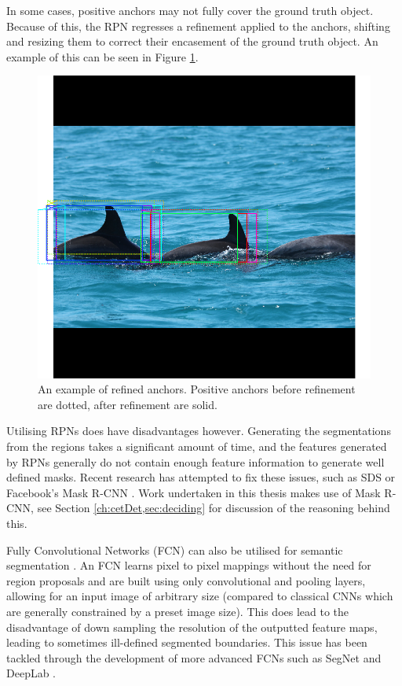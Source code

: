 In some cases, positive anchors may not fully cover the ground truth object. Because of this, the RPN regresses a refinement applied to the anchors, shifting and resizing them to correct their encasement of the ground truth object. An example of this can be seen in Figure \ref{fig:rpn-refined}.

\begin{figure}
	\begin{center}
		\includegraphics[scale=0.3]{Chapter2/figs/rpn-refined.png}
	\end{center}
	\caption[An example of refined anchors.]{An example of refined anchors. Positive anchors before refinement are dotted, after refinement are solid.}
	\label{fig:rpn-refined}
\end{figure}

Utilising RPNs does have disadvantages however. Generating the segmentations from the regions takes a significant amount of time, and the features generated by RPNs generally do not contain enough feature information to generate well defined masks. Recent research has attempted to fix these issues, such as SDS \cite{hariharan_simultaneous_2014} or Facebook's Mask R-CNN \cite{he_mask_2017}. Work undertaken in this thesis makes use of Mask R-CNN, see Section \ref{ch:cetDet,sec:deciding} for discussion of the reasoning behind this.

Fully Convolutional Networks (FCN) can also be utilised for semantic segmentation \cite{long_fully_2014}. An FCN learns pixel to pixel mappings without the need for region proposals and are built using only convolutional and pooling layers, allowing for an input image of arbitrary size (compared to classical CNNs which are generally constrained by a preset image size). This does lead to the disadvantage of down sampling the resolution of the outputted feature maps, leading to sometimes ill-defined segmented boundaries. This issue has been tackled through the development of more advanced FCNs such as SegNet \cite{badrinarayanan_segnet:_2015} and DeepLab \cite{chen_semantic_2014}. 

